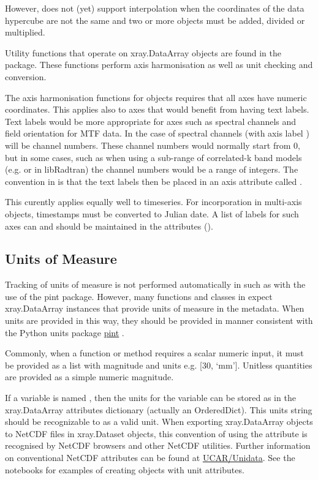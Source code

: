 \documentclass[a4paper,10pt,english]{sphinxmanual}
\begin{document}
However,  does not (yet) support interpolation when the coordinates of the data hypercube are
not the same and two or more  objects must be added, divided or multiplied.

Utility functions that operate on xray.DataArray objects are found in the  package.
These functions perform axis harmonisation as well as unit checking and conversion.

The axis harmonisation functions for  objects requires that all axes have numeric coordinates.
This applies also to axes that would benefit from having text labels. Text labels would be more appropriate for
axes such as spectral channels and field orientation for MTF data. In the case of spectral channels (with axis label
) will be channel numbers. These channel numbers would normally start from 0, but in some cases, such as when
using a sub-range of correlated-k band models (e.g.  or  in libRadtran) the channel numbers would be a
range of integers. The convention in  is that the text labels then be placed in an axis attribute called
.

This curently applies equally well to timeseries. For incorporation in multi-axis  objects, timestamps
must be converted to Julian date. A list of labels for such axes can and should be maintained in the 
attributes ().


\subsection{Units of Measure}
\label{styleguide:units-of-measure}
Tracking of units of measure is not performed automatically in  such as with the use of the pint package.
However, many functions and classes in  expect xray.DataArray instances that provide units of measure in
the metadata. When units are provided in this way, they should be provided in manner consistent with the Python units
package \href{https://pint.readthedocs.org/}{pint} .

Commonly, when a  function or method requires a scalar numeric input, it must be provided as a list
with magnitude and units e.g. {[}30, `mm'{]}. Unitless quantities are provided as a simple numeric magnitude.

If a variable is named , then the units for the variable can be stored as  in the xray.DataArray
attributes dictionary (actually an OrderedDict). This units string should be recognizable to  as a valid unit.
When exporting xray.DataArray objects to NetCDF files in xray.Dataset objects, this convention of using the
 attribute is recognised by NetCDF browsers and other NetCDF utilities. Further information on conventional
NetCDF attributes can be found at
\href{https://www.unidata.ucar.edu/software/thredds/current/netcdf-java/metadata/DataDiscoveryAttConvention.html}{UCAR/Unidata}.
See the  notebooks for examples of creating  objects with unit attributes.
\end{document}

